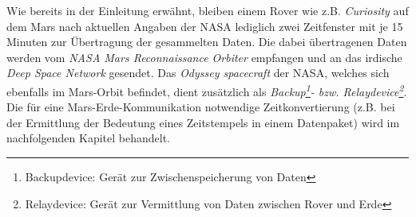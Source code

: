 Wie bereits in der Einleitung erw{\"a}hnt, bleiben einem Rover wie z.B.
\textit{Curiosity} auf dem Mars nach aktuellen Angaben der NASA \cite{web5}
lediglich zwei Zeitfenster mit je 15 Minuten zur {\"U}bertragung der gesammelten
Daten. Die dabei {\"u}bertragenen Daten werden vom \textit{NASA Mars
Reconnaissance Orbiter} empfangen und an das irdische \textit{Deep Space
Network} gesendet. Das \textit{Odyssey spacecraft} der NASA, welches
sich ebenfalls im Mars-Orbit befindet, dient zus{\"a}tzlich als
\textit{Backup\footnote{Backupdevice: Ger{\"a}t zur Zwischenspeicherung von
Daten}- bzw.
Relaydevice\footnote{Relaydevice: Ger{\"a}t zur Vermittlung von Daten zwischen
Rover und Erde}}. Die f{\"u}r eine Mars-Erde-Kommunikation notwendige
Zeitkonvertierung (z.B. bei der Ermittlung der Bedeutung eines Zeitstempels in
einem Datenpaket) wird im nachfolgenden Kapitel behandelt.
\label{Empfangsfenster}